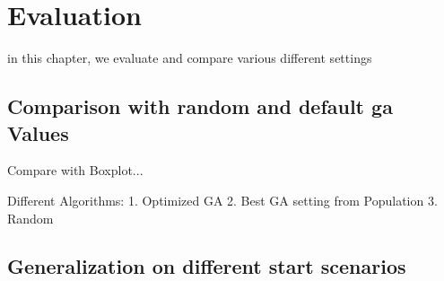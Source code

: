 \chapter{Evaluation}
\label{chap:evaluation}
in this chapter, we evaluate and compare various different settings



\section{Comparison with random and default ga Values}

Compare with Boxplot...

Different Algorithms:
1. Optimized GA
2. Best GA setting from Population
3. Random



\section{Generalization on different start scenarios}
